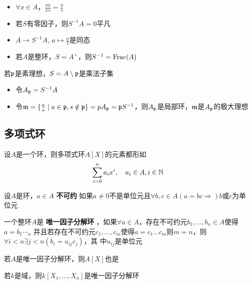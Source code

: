 \documentclass[11pt]{article}
\begin{document}
\begin{remark}
\begin{itemize}
\item \(\forall x\in A\)，\(\frac{xa}{xs}=\frac{a}{s}\)
\item 若\(S\)有零因子，则\(S^{-1}A=0\)平凡
\item \(A\to S^{-1}A\), \(a\mapsto\frac{a}{1}\)是同态
\item 若\(A\)是整环，\(S=A^\times\)，则\(S^{-1}=\operatorname{Frac}(A)\)
\end{itemize}
\end{remark}

\begin{examplle}[]
若\(\mathfrak{p}\)是素理想，\(S=A\setminus \mathfrak{p}\)是乘法子集
\begin{itemize}
\item 令\(A_{\mathfrak{p}}=S^{-1}A\)
\item 令\(\mathfrak{m}=\{\frac{a}{s}\mid a\in\mathfrak{p},s\notin\mathfrak{p}\}=pA_{\mathfrak{p}}=\mathfrak{p} S^{-1}\)，则\(A_{\mathfrak{p}}\)是局部环，\(\mathfrak{m}\)是\(A_{\mathfrak{p}}\)的极大理想
\end{itemize}
\end{examplle}



\subsection{多项式环}
\label{sec:org0b05355}
设\(A\)是一个环，则多项式环\(A[X]\)的元素都形如
\begin{equation*}
\sum_{i=0}^na_ix^i,\quad a_i\in A,i\in\mathbb{N}
\end{equation*}

\begin{definition}[]
设\(A\)是环，\(a\in A\) \textbf{不可约} 如果\(a\neq 0\)不是单位元且\(\forall b,c\in A(a=bc\Rightarrow) b\)或\(c\)为单位元

一个整环\(A\)是 \textbf{唯一因子分解环} ，如果\(\forall a\in A\)，存在不可约元\(b_1,\dots,b_n\in A\)使得\(a=b_1\dotsb_n\)
并且若存在不可约元\(c_1,\dots,c_m\)使得\(a=c_1\dots c_m\)则\(m=n\)，则\(\forall i<n\exists j<n(b_i=u_{ij}c_j)\)，其
中\(u_{ij}\)是单位元
\end{definition}

\begin{proposition}[]
若\(A\)是唯一因子分解环，则\(A[X]\)也是
\end{proposition}

\begin{corollary}[]
若\(k\)是域，则\(k[X_1,\dots,X_n]\)是唯一因子分解环
\end{corollary}
\end{document}
